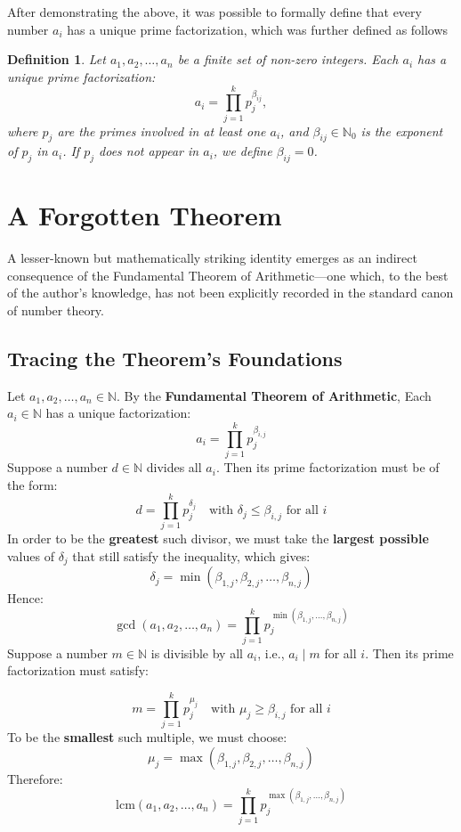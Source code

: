 \documentclass[11pt]{article}
\theoremstyle{plain}
\newtheorem*{definition}{Definition}
\begin{document}
After demonstrating the above, it was possible to formally define that every number $a_i$ has a unique prime factorization, which was further defined as follows

\begin{definition}
Let $a_1, a_2, \dots, a_n$ be a finite set of non-zero integers. Each $a_i$ has a unique prime factorization:
\[
    a_i = \prod_{j=1}^k p_j^{\beta_{ij}},
\]
where $p_j$ are the primes involved in at least one $a_i$, and $\beta_{ij} \in \mathbb{N}_0$ is the exponent of $p_j$ in $a_i$. If $p_j$ does not appear in $a_i$, we define $\beta_{ij} = 0$.
\end{definition}

\section{A Forgotten Theorem}
A lesser-known but mathematically striking identity emerges as an indirect consequence of the Fundamental Theorem of Arithmetic—one which, to the best of the author's knowledge, has not been explicitly recorded in the standard canon of number theory.
\vspace{2mm}

\subsection{Tracing the Theorem’s Foundations}

Let \( a_1, a_2, \dots, a_n \in \mathbb{N} \). By the \textbf{Fundamental Theorem of Arithmetic}, Each \( a_i \in \mathbb{N} \) has a unique factorization:
\[
a_i = \prod_{j=1}^{k} p_j^{\beta_{i,j}}
\]
Suppose a number \( d \in \mathbb{N} \) divides all \( a_i \). Then its prime factorization must be of the form:
\[
d = \prod_{j=1}^{k} p_j^{\delta_j} \quad \text{with } \delta_j \leq \beta_{i,j} \text{ for all } i
\]
In order to be the \textbf{greatest} such divisor, we must take the \textbf{largest possible} values of \( \delta_j \) that still satisfy the inequality, which gives:
\[
\delta_j = \min(\beta_{1,j}, \beta_{2,j}, \dots, \beta_{n,j})
\]
Hence:
\[
\gcd(a_1, a_2, \dots, a_n) = \prod_{j=1}^{k} p_j^{\min(\beta_{1,j}, \dots, \beta_{n,j})}
\]
Suppose a number \( m \in \mathbb{N} \) is divisible by all \( a_i \), i.e., \( a_i \mid m \) for all \( i \). Then its prime factorization must satisfy:

\[
m = \prod_{j=1}^{k} p_j^{\mu_j} \quad \text{with } \mu_j \geq \beta_{i,j} \text{ for all } i
\]
To be the \textbf{smallest} such multiple, we must choose:
\[
\mu_j = \max(\beta_{1,j}, \beta_{2,j}, \dots, \beta_{n,j})
\]
Therefore:
\[
\mathrm{lcm}(a_1, a_2, \dots, a_n) = \prod_{j=1}^{k} p_j^{\max(\beta_{1,j}, \dots, \beta_{n,j})}
\]
\end{document}

